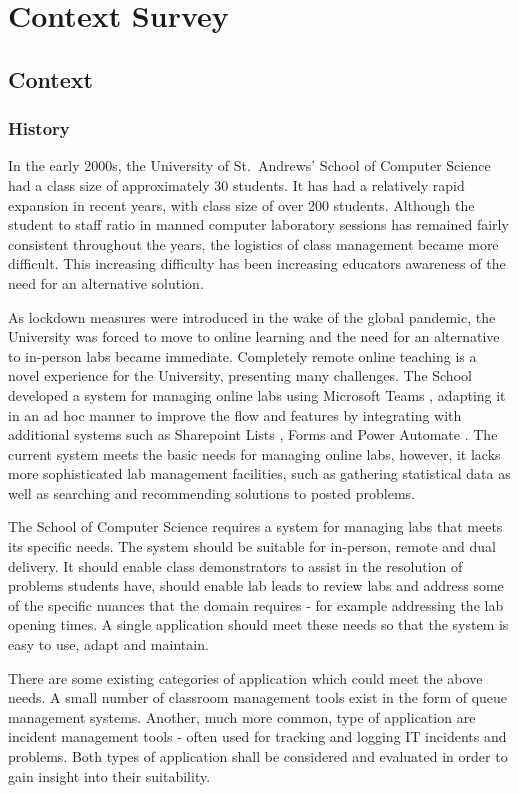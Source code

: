 \chapter{Context Survey}
\section{Context}
\subsection{History}

In the early 2000s, the University of St.\ Andrews' School of Computer Science had a class size of approximately 30 students. It has had a relatively rapid expansion in recent years, with class size of over 200 students. Although the student to staff ratio in manned computer laboratory sessions has remained fairly consistent throughout the years, the logistics of class management became more difficult. This increasing difficulty has been increasing educators awareness of the need for an alternative solution.

As lockdown measures were introduced in the wake of the global pandemic, the University was forced to move to online learning and the need for an alternative to in-person labs became immediate. Completely remote online teaching is a novel experience for the University, presenting many challenges. The School developed a system for managing online labs using Microsoft Teams \cite{teams}, adapting it in an ad hoc manner to improve the flow and features by integrating with additional systems such as Sharepoint Lists \cite{lists}, Forms \cite{forms} and Power Automate \cite{pauto}. The current system meets the basic needs for managing online labs, however, it lacks more sophisticated lab management facilities, such as gathering statistical data as well as searching and recommending solutions to posted problems.   

The School of Computer Science requires a system for managing labs that meets its specific needs. The system should be suitable for in-person, remote and dual delivery. It should enable class demonstrators to assist in the resolution of problems students have, should enable lab leads to review labs and address some of the specific nuances that the domain requires - for example addressing the lab opening times. A single application should meet these needs so that the system is easy to use, adapt and maintain.

There are some existing categories of application which could meet the above needs. A small number of classroom management tools exist in the form of queue management systems. Another, much more common, type of application are incident management tools - often used for tracking and logging IT incidents and problems. Both types of application shall be considered and evaluated in order to gain insight into their suitability.
 
